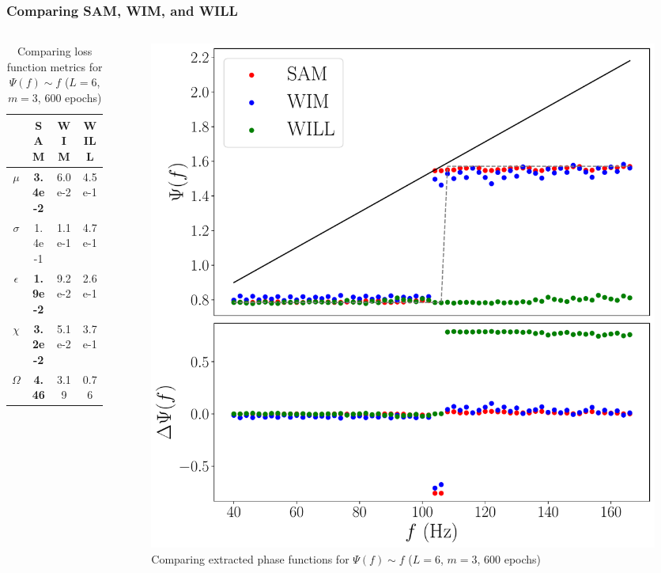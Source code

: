 \documentclass{beamer}
\begin{document}
\begin{frame}
\frametitle{Comparing SAM, WIM, and WILL}
\begin{columns}
\begin{column}{0.5\textwidth}
\begin{table}
\begin{tabular}{c || c| c| c }
& SAM & WIM & WILL \\ \hline \hline 
$\mu$ &  \textbf{3.4e-2} & 6.0e-2 & 4.5e-1 \\
$\sigma$ &  1.4e-1 &1.1e-1 & 4.7e-1 \\
$\epsilon$  &  \textbf{1.9e-2} & 9.2e-2 & 2.6e-1  \\
$\chi$ & \textbf{ 3.2e-2} & 5.1e-2  & 3.7e-1  \\ \hline 
$\Omega$ &  \textbf{4.46} & 3.19 & 0.76
\end{tabular}
\caption{Comparing loss function metrics for $\Psi(f) \sim f$ ($L=6$, $m=3$, 600 epochs)}
\end{table}
\end{column}
\begin{column}{0.5\textwidth}
\begin{figure}
\centering 
\includegraphics[width=\textwidth]{im/SAM_WIM_WILL_F_new}
\caption{Comparing extracted phase functions for $\Psi(f) \sim f$ ($L=6$, $m=3$, 600 epochs)}
\end{figure}
\end{column}
\end{columns}
\end{frame}
\end{document}
